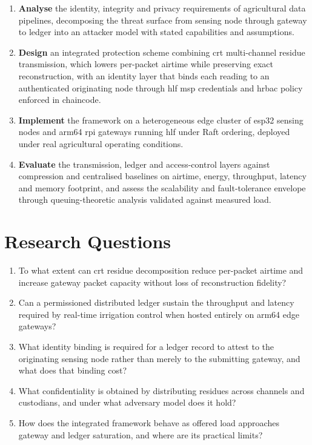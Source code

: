 \begin{enumerate}
  \item \textbf{Analyse} the identity, integrity and privacy requirements of
        agricultural data pipelines, decomposing the threat surface from
        sensing node through gateway to ledger into an attacker model with
        stated capabilities and assumptions.

  \item \textbf{Design} an integrated protection scheme combining \gls{crt}
        multi-channel residue transmission, which lowers per-packet airtime
        while preserving exact reconstruction, with an identity layer that
        binds each reading to an authenticated originating node through
        \gls{hlf} \gls{msp} credentials and \gls{hrbac} policy enforced in
        chaincode.

  \item \textbf{Implement} the framework on a heterogeneous edge cluster of
        \gls{esp32} sensing nodes and \gls{arm64} \gls{rpi} gateways running
        \gls{hlf} under Raft ordering, deployed under real agricultural
        operating conditions.

  \item \textbf{Evaluate} the transmission, ledger and access-control layers
        against compression and centralised baselines on airtime, energy,
        throughput, latency and memory footprint, and assess the scalability
        and fault-tolerance envelope through queuing-theoretic analysis
        validated against measured load.
\end{enumerate}

\section{Research Questions}
\label{sec:research_questions}

\begin{enumerate}[label=\textbf{RQ\arabic*.}]
  \item To what extent can \gls{crt} residue decomposition reduce per-packet
        airtime and increase gateway packet capacity without loss of
        reconstruction fidelity?
  \item Can a permissioned distributed ledger sustain the throughput and latency
        required by real-time irrigation control when hosted entirely on
        \gls{arm64} edge gateways?
  \item What identity binding is required for a ledger record to attest to the
        originating sensing node rather than merely to the submitting gateway,
        and what does that binding cost?
  \item What confidentiality is obtained by distributing residues across
        channels and custodians, and under what adversary model does it hold?
  \item How does the integrated framework behave as offered load approaches
        gateway and ledger saturation, and where are its practical limits?
\end{enumerate}

